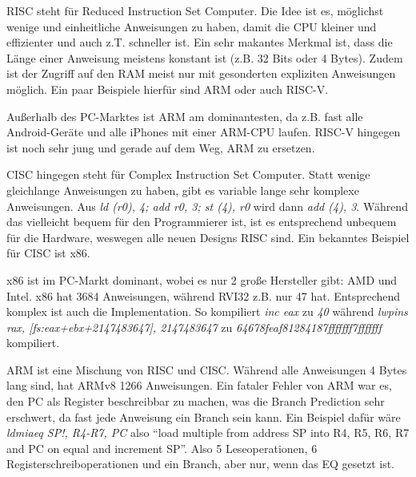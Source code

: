 \documentclass[8pt, letterpaper]{article}
\begin{document}
RISC steht für Reduced Instruction Set Computer. Die Idee ist es, möglichst wenige und einheitliche Anweisungen zu haben, damit die CPU kleiner und effizienter und auch z.T. schneller ist. Ein sehr makantes Merkmal ist, dass die Länge einer Anweisung meistens konstant ist (z.B. 32 Bits oder 4 Bytes). Zudem ist der Zugriff auf den RAM meist nur mit gesonderten expliziten Anweisungen möglich. Ein paar Beispiele hierfür sind ARM\cite{arm-isa} oder auch RISC-V\cite{riscv-isa}.

Außerhalb des PC-Marktes ist ARM am dominantesten, da z.B. fast alle Android-Geräte und alle iPhones mit einer ARM-CPU laufen. RISC-V hingegen ist noch sehr jung und gerade auf dem Weg, ARM zu ersetzen.

CISC hingegen steht für Complex Instruction Set Computer. Statt wenige gleichlange Anweisungen zu haben, gibt es variable lange sehr komplexe Anweisungen. Aus \textit{ld (r0), 4; add r0, 3; st (4), r0} wird dann \textit{add (4), 3}. Während das vielleicht bequem für den Programmierer ist, ist es entsprechend unbequem für die Hardware, weswegen alle neuen Designs RISC sind. Ein bekanntes Beispiel für CISC ist x86.

x86 ist im PC-Markt dominant, wobei es nur 2 große Hersteller gibt: AMD und Intel. x86 hat 3684 Anweisungen\cite{x86-instcount}, während RVI32 z.B. nur 47 hat\cite{riscv-isa}. Entsprechend komplex ist auch die Implementation. So kompiliert \textit{inc eax} zu \textit{40} während \textit{lwpins rax, [fs:eax+ebx+2147483647], 2147483647} zu \textit{64678feaf81284187fffffff7fffffff} kompiliert.

ARM ist eine Mischung von RISC und CISC. Während alle Anweisungen 4 Bytes lang sind, hat ARMv8 1266 Anweisungen\cite{armv8-instcount}. Ein fataler Fehler von ARM war es, den PC als Register beschreibbar zu machen, was die Branch Prediction sehr erschwert, da fast jede Anweisung ein Branch sein kann. Ein Beispiel dafür wäre \textit{ldmiaeq SP!, {R4-R7, PC}} also ``load multiple from address SP into R4, R5, R6, R7 and PC on equal and increment SP''. Also 5 Leseoperationen, 6 Registerschreiboperationen und ein Branch, aber nur, wenn das EQ gesetzt ist.

\newpage

\end{document}
